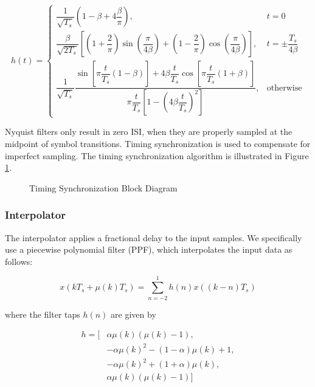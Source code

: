 \documentclass[conference,onecolumn]{IEEEtran}
\begin{document}
\begin{equation}
	h(t) = \begin{cases}
		\dfrac{1}{\sqrt{T_s}}\left(1 - \beta + 4\dfrac{\beta}{\pi}\right), & t = 0 \\[12pt]
		\dfrac{\beta}{\sqrt{2T_s}}\left[\left(1 + \dfrac{2}{\pi}\right)\sin\left(\dfrac{\pi}{4\beta}\right)+ \left(1-\dfrac{2}{\pi}\right)\cos\left(\dfrac{\pi}{4\beta}\right)\right], & t = \pm\dfrac{T_s}{4\beta} \\[12pt]
		\dfrac{1}{\sqrt{T_s}}\dfrac{\sin\left[\pi\dfrac{t}{T_s}(1-\beta)\right]+4\beta\dfrac{t}{T_s}\cos\left[\pi\dfrac{t}{T_s}(1+\beta)\right]}{\pi\dfrac{t}{T_s}\left[1 - \left(4\beta\dfrac{t}{T_s}\right)^2\right]}, & \text{otherwise}
	\end{cases}
	\label{eq::srrc_filter}
\end{equation}

\noindent Nyquist filters only result in zero ISI, when they are properly sampled at the midpoint of symbol transitions. Timing synchronization is used to compensate for imperfect sampling. The timing synchronization algorithm is illustrated in Figure \ref{fig::timing_synchronization}.

\begin{figure}[H]
	\centerline{}
	\caption{Timing Synchronization Block Diagram}
	\label{fig::timing_synchronization}
\end{figure}

\subsubsection{Interpolator}

\noindent The interpolator applies a fractional delay to the input samples. We specifically use a piecewise polynomial filter (PPF), which interpolates the input data as follows:

\begin{equation}
	x(kT_s + \mu(k)T_s) = \sum_{n=-2}^{1}{h(n)x((k-n)T_s)}
\end{equation}

\noindent where the filter taps $h(n)$ are given by

\begin{equation}
\begin{split}
	h = [&\alpha\mu(k)(\mu(k) - 1), \\
	&-\alpha\mu(k)^2 - (1-\alpha)\mu(k) + 1,\\
	&-\alpha\mu(k)^2 + (1+\alpha)\mu(k),\\
	&\alpha\mu(k)(\mu(k) - 1)]
\end{split}
\end{equation}
\end{document}
